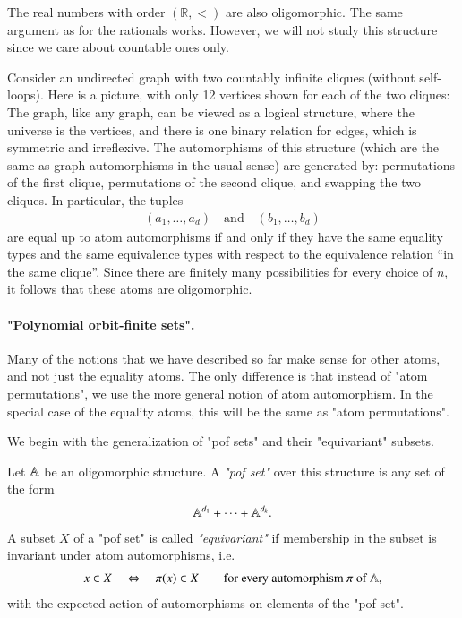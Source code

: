 \begin{myexample}
    The real numbers with order $(\mathbb R, <)$ are also oligomorphic. The same argument as for the rationals works. However, we will not study this structure since we care about countable ones only.
\end{myexample}



\begin{myexample}\label{ex:two-cliques}
	Consider an undirected graph with two countably infinite cliques (without self-loops). Here is a picture, with only 12 vertices shown for each of the two cliques:
	The graph, like any graph, can be viewed as a logical structure, where the universe is the vertices, and there is one binary relation for edges, which is symmetric and irreflexive. 
	The automorphisms of this structure (which are the same as graph automorphisms in the usual sense) are generated by: permutations of the first clique, permutations of the second clique, and swapping the two cliques. In particular, the tuples
	\begin{align*}
		(a_1,\ldots,a_d) \quad \text{and} \quad (b_1,\ldots,b_d)
	\end{align*} 
	are equal up to atom automorphisms if and only if they have the same equality types and the same equivalence types with respect to the equivalence relation ``in the same clique''. Since there are finitely many possibilities for every choice of $n$, it follows that these atoms are oligomorphic.
\end{myexample}

\paragraph*{"Polynomial orbit-finite sets".} Many of the notions that we have described so far make sense for other atoms, and not just the equality atoms. The only difference is that instead of "atom permutations", we use the more general notion of atom automorphism. In the special case of the equality atoms, this will be the same as "atom permutations". 

We begin with the generalization of "pof sets" and their "equivariant" subsets. 

\begin{definition}
    Let $\mathbb A$ be an oligomorphic  structure. A \emph{"pof set"} over this structure is any set of the form 
    \begin{align*}
    \mathbb A^{d_1} + \cdots + \mathbb A^{d_k}.
    \end{align*}
    A subset $X$ of a  "pof set" is called \emph{"equivariant"} if membership in the subset is invariant under atom automorphisms, i.e.
    \begin{align*}
    x \in X \quad \Leftrightarrow \quad \pi(x) \in X \qquad \text{for every automorphism $\pi$ of $\mathbb A$},
    \end{align*}
    with the expected action of automorphisms on elements of the "pof set".
\end{definition}

